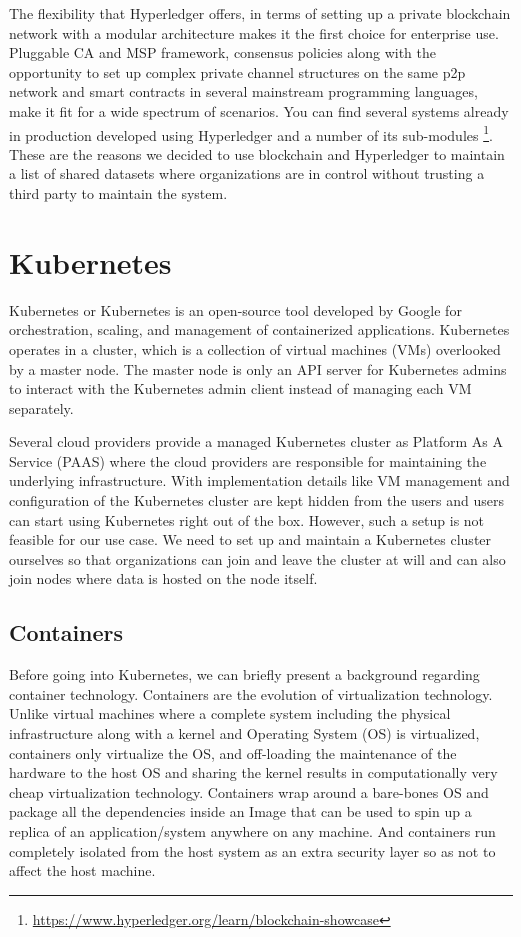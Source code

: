 \bigskip
The flexibility that Hyperledger offers, in terms of setting up a private blockchain network with a modular architecture makes it the first choice for enterprise use. Pluggable CA and MSP framework, consensus policies along with the opportunity to set up complex private channel structures on the same p2p network and smart contracts in several mainstream programming languages, make it fit for a wide spectrum of scenarios. You can find several systems already in production developed using Hyperledger and a number of its sub-modules \footnote{\url{https://www.hyperledger.org/learn/blockchain-showcase}}. These are the reasons we decided to use blockchain and Hyperledger to maintain a list of shared datasets where organizations are in control without trusting a third party to maintain the system.

\section{Kubernetes}
Kubernetes or Kubernetes is an open-source tool developed by Google for orchestration, scaling, and management of containerized applications. Kubernetes operates in a cluster, which is a collection of virtual machines (VMs) overlooked by a master node. The master node is only an API server for Kubernetes admins to interact with the Kubernetes admin client instead of managing each VM separately.

\bigskip
Several cloud providers provide a managed Kubernetes cluster as Platform As A Service (PAAS) where the cloud providers are responsible for maintaining the underlying infrastructure. With implementation details like VM management and configuration of the Kubernetes cluster are kept hidden from the users and users can start using Kubernetes right out of the box. However, such a setup is not feasible for our use case. We need to set up and maintain a Kubernetes cluster ourselves so that organizations can join and leave the cluster at will and can also join nodes where data is hosted on the node itself.

\subsection{Containers}
Before going into Kubernetes, we can briefly present a background regarding container technology. Containers are the evolution of virtualization technology. Unlike virtual machines where a complete system including the physical infrastructure along with a kernel and Operating System (OS) is virtualized, containers only virtualize the OS, and off-loading the maintenance of the hardware to the host OS and sharing the kernel results in computationally very cheap virtualization technology. Containers wrap around a bare-bones OS and package all the dependencies inside an Image that can be used to spin up a replica of an application/system anywhere on any machine. And containers run completely isolated from the host system as an extra security layer so as not to affect the host machine.

